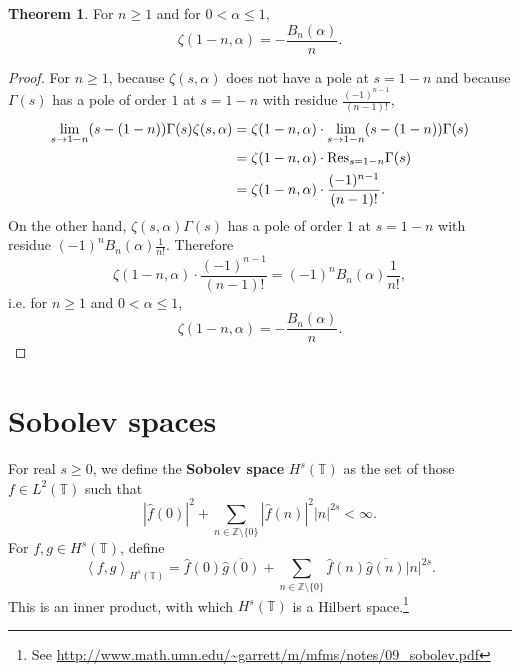 \documentclass{article}
\newcommand{\inner}[2]{\left\langle #1, #2 \right\rangle}
\newcommand{\Res}{\ensuremath\mathrm{Res}}
\theoremstyle{definition}
\newtheorem{theorem}{Theorem}
\theoremstyle{definition}
\begin{document}
\begin{theorem}
For $n \geq 1$ and for $0<\alpha \leq 1$,
\[
\zeta(1-n,\alpha) = -\frac{B_n(\alpha)}{n}.
\]
\end{theorem}
\begin{proof}
For $n \geq 1$,  because $\zeta(s,\alpha)$ does not have a pole at $s=1-n$ and because $\Gamma(s)$ has a pole
of order $1$ at $s=1-n$ with residue $\frac{(-1)^{n-1}}{(n-1)!}$,
\begin{align*}
\lim_{s \to 1-n} (s-(1-n)) \Gamma(s) \zeta(s,\alpha) &= \zeta(1-n,\alpha) \cdot \lim_{s \to 1-n} (s-(1-n)) \Gamma(s)\\
&=\zeta(1-n,\alpha) \cdot \Res_{s=1-n} \Gamma(s)\\
&=\zeta(1-n,\alpha) \cdot \frac{(-1)^{n-1}}{(n-1)!}.
\end{align*}
On the other hand, $\zeta(s,\alpha) \Gamma(s)$ has a pole of order $1$ at $s=1-n$ with residue
$(-1)^n B_n(\alpha) \frac{1}{n!}$. Therefore
\[
\zeta(1-n,\alpha) \cdot \frac{(-1)^{n-1}}{(n-1)!} = (-1)^n B_n(\alpha) \frac{1}{n!},
\]
i.e. for $n \geq 1$ and $0<\alpha \leq 1$,
\[
\zeta(1-n,\alpha) = -\frac{B_n(\alpha)}{n}.
\]
\end{proof}


\section{Sobolev spaces}
For real $s \geq 0$, we define the \textbf{Sobolev space} $H^s(\mathbb{T})$ as the set of those
 $f \in L^2(\mathbb{T})$ such that
\[
|\widehat{f}(0)|^2  + \sum_{n \in \mathbb{Z} \setminus \{0\}} |\widehat{f}(n)|^2 |n|^{2s} < \infty.
\]
For $f,g \in H^s(\mathbb{T})$, define
\[
\inner{f}{g}_{H^s(\mathbb{T})} = \widehat{f}(0) \overline{\widehat{g}(0)} + \sum_{n \in \mathbb{Z} \setminus \{0\}} \widehat{f}(n)
\overline{\widehat{g}(n)} |n|^{2s}.
\]
This is an inner product, with which $H^s(\mathbb{T})$ is a Hilbert space.\footnote{See \url{http://www.math.umn.edu/~garrett/m/mfms/notes/09_sobolev.pdf}}
\end{document}
